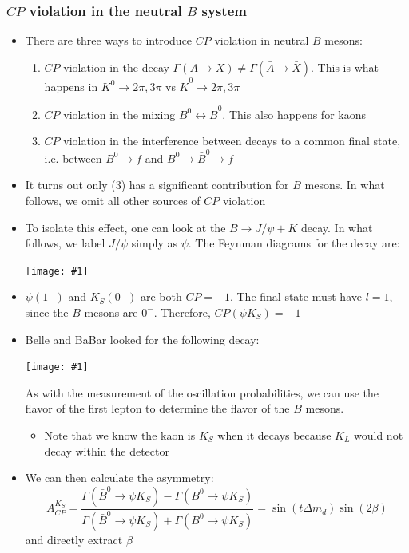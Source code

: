 \documentclass[11pt]{article}
\newcommand{\CP}{\ensuremath{CP}\xspace}
\newcommand{\embedimgw}[2]{\begin{center}\texttt{[image: \#1]}\end{center}}
\begin{document}
\subsubsection{\CP violation in the neutral $B$ system}
\begin{itemize}
  \item There are three ways to introduce \CP violation in neutral $B$ mesons:
  \begin{enumerate}
    \item \CP violation in the decay $\Gamma(A\rightarrow X) \neq \Gamma(\bar A \rightarrow \bar X)$. This is what happens in $K^0\rightarrow 2\pi,3\pi$ vs $\bar K^0\rightarrow 2\pi,3\pi$
    \item \CP violation in the mixing $B^0 \leftrightarrow \bar B^0$. This also happens for kaons
    \item \CP violation in the interference between decays to a common final state, i.e. between $B^0\rightarrow f$ and $B^0\rightarrow \bar B^0\rightarrow f$
  \end{enumerate}
  \item It turns out only (3) has a significant contribution for $B$ mesons. In what follows, we omit all other sources of \CP violation
  \item To isolate this effect, one can look at the $B\rightarrow J/\psi + K$ decay. In what follows, we label $J/\psi$ simply as $\psi$. The Feynman diagrams for the decay are:
  \embedimgw{figs/bhadronic.png}{.6}
  \item $\psi (1^-)$ and $K_S(0^-)$ are both $\CP=+1$. The final state must have $l=1$, since the $B$ mesons are $0^-$. Therefore, $\CP(\psi K_S) = -1$
  \item Belle and BaBar looked for the following decay:
  \embedimgw{figs/babarhadronic.png}{.6}
  As with the measurement of the oscillation probabilities, we can use the flavor of the first lepton to determine the flavor of the $B$ mesons. 
  \begin{itemize}
    \item Note that we know the kaon is $K_S$ when it decays because $K_L$ would not decay within the detector
  \end{itemize}
  \item We can then calculate the asymmetry:
  \begin{equation}
    A^{K_S}_{CP} = \frac{\Gamma(\bar B^0 \rightarrow \psi K_S)-\Gamma(B^0 \rightarrow \psi K_S)}{\Gamma(\bar B^0 \rightarrow \psi K_S)+\Gamma(B^0 \rightarrow \psi K_S)} = \sin (t\Delta m_d) \sin(2\beta)
  \end{equation}
  and directly extract $\beta$
\end{itemize}
\end{document}
